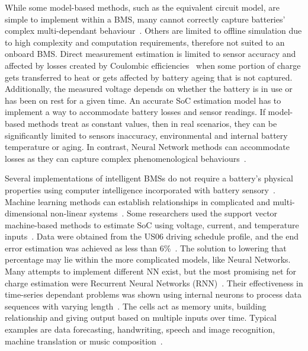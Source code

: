 %
%
While some model-based methods, such as the equivalent circuit model, are simple to implement within a BMS, many cannot correctly capture batteries' complex multi-dependant behaviour~\cite{6953745}.
Others are limited to offline simulation due to high complexity and computation requirements, therefore not suited to an onboard BMS.
Direct measurement estimation is limited to sensor accuracy and affected by losses created by Coulombic efficiencies~\cite{Smith_2010} when some portion of charge gets transferred to heat or gets affected by battery ageing that is not captured.
Additionally, the measured voltage depends on whether the battery is in use or has been on rest for a given time.
An accurate SoC estimation model has to implement a way to accommodate battery losses and sensor readings.
If model-based methods treat as constant values, then in real scenarios, they can be significantly limited to sensors inaccuracy, environmental and internal battery temperature or aging.
In contrast, Neural Network methods can accommodate losses as they can capture complex phenomenological behaviours~\cite{bengio_learning_1994}.

%
%
Several implementations of intelligent BMSs do not require a battery's physical properties using computer intelligence incorporated with battery sensory~\cite{zhang_deep_2020}.
Machine learning methods can establish relationships in complicated and multi-dimensional non-linear systems~\cite{hansen_support_2005,anton_battery_2013,he_state_2014}.
Some researchers used the support vector machine-based methods to estimate SoC using voltage, current, and temperature inputs~\cite{hansen_support_2005,anton_battery_2013}.
Data were obtained from the US06 driving schedule profile, and the end error estimation was achieved as less than 6\%~\cite{he_state_2014}.
The solution to lowering that percentage may lie within the more complicated models, like Neural Networks.
Many attempts to implement different NN exist, but the most promising net for charge estimation were Recurrent Neural Networks (RNN)~\cite{song_lithium-ion_2018,Chemali2017,mamo_long_2020,jiao_gru-rnn_2020,xiao_accurate_2019,javid_adaptive_2020,zhang_deep_2020}.
Their effectiveness in time-series dependant problems was shown using internal neurons to process data sequences with varying length~\cite{Chemali2017}.
The cells act as memory units, building relationship and giving output based on multiple inputs over time.
Typical examples are data forecasting, handwriting, speech and image recognition, machine translation or music composition~\cite{devdarshan_applications_2019}. 

